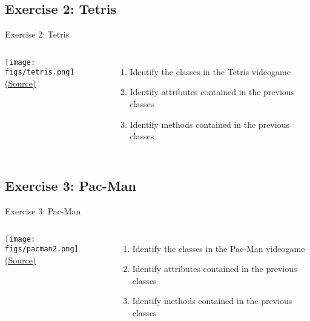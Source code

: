 \documentclass[10pt,compress]{beamer} %
\begin{document}
\subsection{Exercise 2: Tetris}
	\begin{frame}{Exercise 2: Tetris}
    \begin{columns}
		\centering \texttt{[image: figs/tetris.png]}\\
		\tiny{\href{http://gamedevelopment.tutsplus.com/tutorials/quick-tip-intro-to-object-oriented-programming-for-game-development--gamedev-1805}{(Source)}}
	\begin{enumerate}
	\item Identify the classes in the Tetris videogame
	\item Identify attributes contained in the previous classes
	\item Identify methods contained in the previous classes
	\end{enumerate}
	\end{columns}
\end{frame}

\subsection{Exercise 3: Pac-Man}
	\begin{frame}{Exercise 3: Pac-Man}
    \begin{columns}
		\centering \texttt{[image: figs/pacman2.png]}\\
		\tiny{\href{http://gamedevelopment.tutsplus.com/tutorials/quick-tip-intro-to-object-oriented-programming-for-game-development--gamedev-1805}{(Source)}}
	\begin{enumerate}
	\item Identify the classes in the Pac-Man videogame
	\item Identify attributes contained in the previous classes
	\item Identify methods contained in the previous classes
	\end{enumerate}
	\end{columns}
\end{frame}
\end{document}
